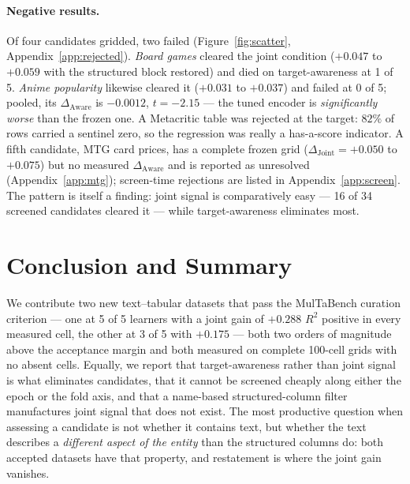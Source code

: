 \documentclass[10pt,letterpaper]{article}
\newcommand{\dj}{\Delta_{\mathrm{Joint}}}
\newcommand{\da}{\Delta_{\mathrm{Aware}}}
\begin{document}
\paragraph{Negative results.} Of four candidates gridded, two failed
(Figure~\ref{fig:scatter}, Appendix~\ref{app:rejected}). \emph{Board games} cleared the joint
condition ($+0.047$ to $+0.059$ with the structured block restored) and died on
target-awareness at 1 of 5. \emph{Anime popularity} likewise cleared it ($+0.031$ to $+0.037$)
and failed at 0 of 5; pooled, its $\da$ is $-0.0012$, $t = -2.15$ --- the tuned encoder is
\emph{significantly worse} than the frozen one. A Metacritic table was rejected at the target:
$82\%$ of rows carried a sentinel zero, so the regression was really a has-a-score indicator. A
fifth candidate, MTG card prices, has a complete frozen grid ($\dj = +0.050$ to $+0.075$) but no
measured $\da$ and is reported as unresolved (Appendix~\ref{app:mtg}); screen-time rejections
are listed in Appendix~\ref{app:screen}. The pattern is itself a finding: joint signal is
comparatively easy --- 16 of 34 screened candidates cleared it --- while target-awareness
eliminates most.

\section{Conclusion and Summary}

We contribute two new text--tabular datasets that pass the MulTaBench curation criterion --- one
at 5 of 5 learners with a joint gain of $+0.288$ $R^2$ positive in every measured cell, the
other at 3 of 5 with $+0.175$ --- both two orders of magnitude above the acceptance margin and
both measured on complete 100-cell grids with no absent cells. Equally, we report that
target-awareness rather than joint signal is what eliminates candidates, that it cannot be
screened cheaply along either the epoch or the fold axis, and that a name-based
structured-column filter manufactures joint signal that does not exist. The most productive
question when assessing a candidate is not whether it contains text, but whether the text
describes a \emph{different aspect of the entity} than the structured columns do: both accepted
datasets have that property, and restatement is where the joint gain vanishes.
\end{document}
